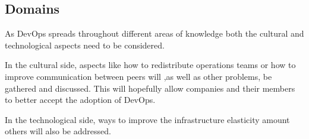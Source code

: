     		\subsection{Domains}
    
    		As DevOps spreads throughout different areas of knowledge both the cultural and technological aspects need to be considered. 
    
    		In the cultural side, aspects like how to redistribute operations teams or how to improve communication between peers will ,as well as other problems, be gathered and discussed. This will hopefully allow companies and their members to better accept the adoption of DevOps.
    
    		In the technological side, ways to improve the infrastructure elasticity amount others will also be addressed.  


